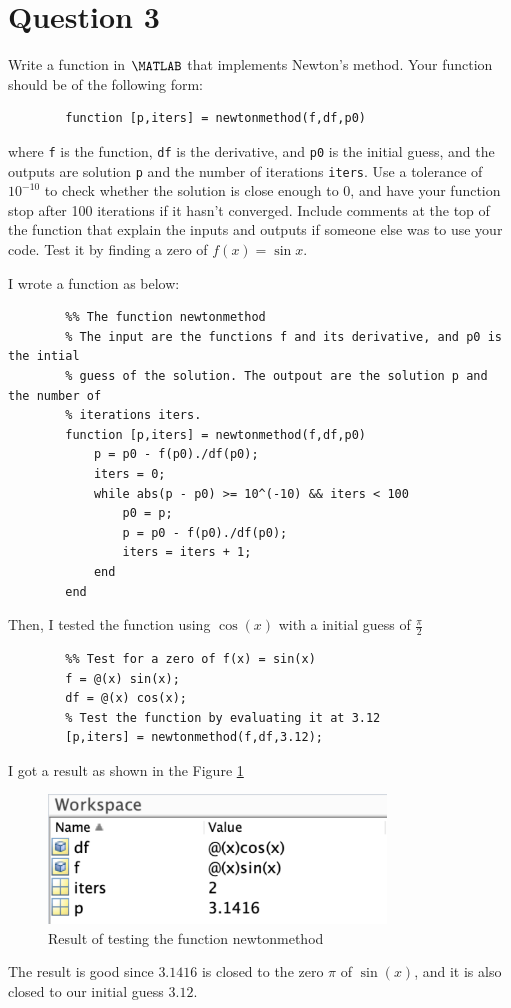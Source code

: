 \section{Question 3}

\begin{question}
    Write a function in $\MATLAB$ that implements Newton's method. Your function should be of the following form:
	\begin{verbatim}
		function [p,iters] = newtonmethod(f,df,p0)
	\end{verbatim}
	where \verb+f+ is the function, \verb+df+ is the derivative, and \verb+p0+ is the initial guess, and the outputs are solution \verb+p+ and the number of iterations \verb+iters+. Use a tolerance of $10^{-10}$ to check whether the solution is close enough to 0, and have your function stop after 100 iterations if it hasn't converged. Include comments at the top of the function that explain the inputs and outputs if someone else was to use your code. Test it by finding a zero of $f(x) = \sin x$.
\end{question}

\begin{answer}
    I wrote a function as below:
    \begin{verbatim}
        %% The function newtonmethod
        % The input are the functions f and its derivative, and p0 is the intial 
        % guess of the solution. The outpout are the solution p and the number of
        % iterations iters.
        function [p,iters] = newtonmethod(f,df,p0)
            p = p0 - f(p0)./df(p0);
            iters = 0;
            while abs(p - p0) >= 10^(-10) && iters < 100
                p0 = p;
                p = p0 - f(p0)./df(p0);
                iters = iters + 1;
            end
        end
    \end{verbatim}
    Then, I tested the function using $\cos{(x)}$ with a initial guess of $\tfrac{\pi}{2}$
    \begin{verbatim}
        %% Test for a zero of f(x) = sin(x)
        f = @(x) sin(x);
        df = @(x) cos(x);
        % Test the function by evaluating it at 3.12
        [p,iters] = newtonmethod(f,df,3.12);
    \end{verbatim}
    I got a result as shown in the Figure \ref{fig:fig1}
    \begin{figure}[H]
        \centering
        \includegraphics[width=0.8\textwidth]{Figure 1.png}
        \caption{\label{fig:fig1}Result of testing the function newtonmethod}
    \end{figure}
    The result is good since $3.1416$ is closed to the zero $\pi$ of $\sin{(x)}$, and it is also closed to our initial guess $3.12$.
\end{answer}